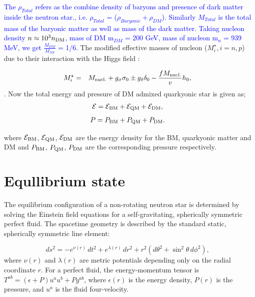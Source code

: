 \noindent
\textcolor{blue}{The $\rho_{Total}$ refers as the combine density of baryons and presence of dark matter inside the neutron star., i.e. $\rho_{Total}$ = ($\rho_{Baryonic} + \rho_{DM}$). Similarly $M_{Total}$ is the total mass of the baryonic matter as well as mass of the dark matter. Taking nucleon density  $n \approx 10^3 n_{\rm DM}$, mass of DM m$_{DM}$ = 200 GeV, mass of nucleon m$_n$ = 939 MeV, we get  $\frac{M_{DM}}{M_{NS}}$ = 1/6.   }The modified effective masses of nucleon ($M_{i}^\star, i = n, p$) due to their interaction with the Higgs field : 

\begin{eqnarray}
	M_{i}^\star &=& M_{\rm nucl.}+ g_\sigma \sigma_0 \pm g_\delta \delta_0 - \frac{f M_{\rm nucl.}}{v}h_0, 
	\nonumber\\
\end{eqnarray}
. Now the total energy and pressure of DM admixed quarkyonic star is given as;
\begin{eqnarray}
	\cal{E} = {\cal{E}}_{\rm BM} + {\cal{E}}_{\rm QM} + {\cal{E}_{\rm DM}},
	\label{eq:e_total}
\end{eqnarray}
\begin{eqnarray}
	P= P_{\rm BM}+ P_{\rm QM} + P_{\rm DM}.
	\label{eq:p_total}
\end{eqnarray}

where  ${\cal{E}}_{\rm BM}$, ${\cal{E}}_{\rm QM}$, $\cal{E}_{\rm DM}$ are the energy density for the BM, quarkyonic matter and DM and   $P_{\rm BM}$,  $P_{\rm QM}$,  $P_{\rm DM}$ are the corresponding pressure respectively.



 \section{Equllibrium state }
 
 The equilibrium configuration of a non-rotating neutron star is determined by solving the Einstein field equations for a self-gravitating, spherically symmetric perfect fluid. The spacetime geometry is described by the standard static, spherically symmetric line element:
 
 \begin{equation}
 	ds^{2} = -e^{\nu(r)}\,dt^{2} + e^{\lambda(r)}\,dr^{2} + r^{2}(d\theta^{2}+\sin^{2} \theta\,d\phi^{2}), \label{eq:metric}
 \end{equation}
 \noindent
 where $\nu(r)$ and $\lambda(r)$ are metric potentials depending only on the radial coordinate $r$. For a perfect fluid, the energy-momentum tensor is $T^{ab} = (\epsilon + P)u^{a}u^{b} + Pg^{ab}$, where $\epsilon(r)$ is the energy density, $P(r)$ is the pressure, and $u^a$ is the fluid four-velocity.
 
